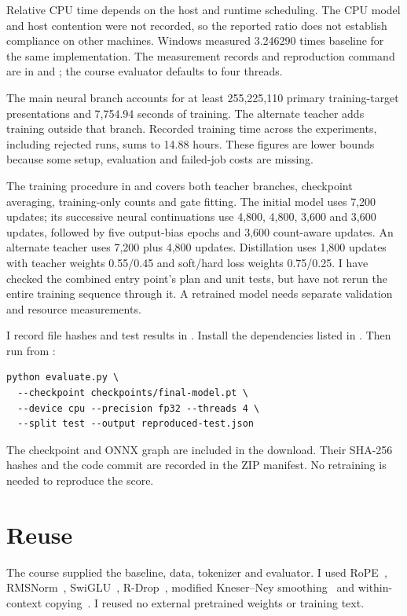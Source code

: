 \documentclass[11pt,a4paper]{article}
\begin{document}
Relative CPU time depends on the host and runtime scheduling. The CPU model and host contention were not recorded, so the reported ratio does not establish compliance on other machines. Windows measured 3.246290 times baseline for the same implementation. The measurement records and reproduction command are in  and ; the course evaluator defaults to four threads.

The main neural branch accounts for at least 255,225,110 primary training-target presentations and 7,754.94 seconds of training. The alternate teacher adds training outside that branch. Recorded training time across the experiments, including rejected runs, sums to 14.88 hours. These figures are lower bounds because some setup, evaluation and failed-job costs are missing.

The training procedure in  and  covers both teacher branches, checkpoint averaging, training-only counts and gate fitting. The initial model uses 7,200 updates; its successive neural continuations use 4,800, 4,800, 3,600 and 3,600 updates, followed by five output-bias epochs and 3,600 count-aware updates. An alternate teacher uses 7,200 plus 4,800 updates. Distillation uses 1,800 updates with teacher weights 0.55/0.45 and soft/hard loss weights 0.75/0.25. I have checked the combined entry point's plan and unit tests, but have not rerun the entire training sequence through it. A retrained model needs separate validation and resource measurements.

I record file hashes and test results in . Install the dependencies listed in . Then run from :

\begingroup\footnotesize
\begin{verbatim}
python evaluate.py \
  --checkpoint checkpoints/final-model.pt \
  --device cpu --precision fp32 --threads 4 \
  --split test --output reproduced-test.json
\end{verbatim}
\endgroup
The checkpoint and ONNX graph are included in the download. Their SHA-256 hashes and the code commit are recorded in the ZIP manifest. No retraining is needed to reproduce the score.

\section{Reuse}

The course supplied the baseline, data, tokenizer and evaluator. I used RoPE~\cite{rope}, RMSNorm~\cite{rmsnorm}, SwiGLU~\cite{swiglu}, R-Drop~\cite{rdrop}, modified Kneser--Ney smoothing~\cite{mkn} and within-context copying~\cite{pointer}. I reused no external pretrained weights or training text.
\end{document}
